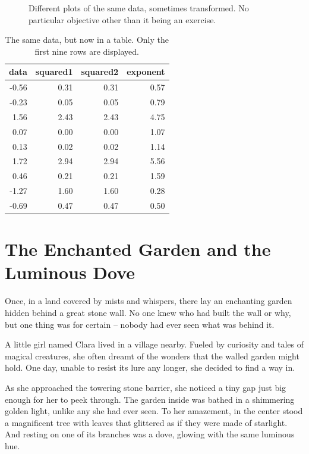 \documentclass[10pt, a4paper, titlepage]{article}
\begin{document}
\begin{figure}[htbp]
    \caption{Different plots of the same data, sometimes transformed. No particular objective other than it being an exercise.}
    \label{fig:main}
\end{figure}

\begin{table}[!h]
\centering
\caption{The same data, but now in a table. Only the first nine rows are displayed.} 
\begin{tabular}{rrrr}
  \hline
data & squared1 & squared2 & exponent \\ 
  \hline
-0.56 & 0.31 & 0.31 & 0.57 \\ 
  -0.23 & 0.05 & 0.05 & 0.79 \\ 
  1.56 & 2.43 & 2.43 & 4.75 \\ 
  0.07 & 0.00 & 0.00 & 1.07 \\ 
  0.13 & 0.02 & 0.02 & 1.14 \\ 
  1.72 & 2.94 & 2.94 & 5.56 \\ 
  0.46 & 0.21 & 0.21 & 1.59 \\ 
  -1.27 & 1.60 & 1.60 & 0.28 \\ 
  -0.69 & 0.47 & 0.47 & 0.50 \\ 
   \hline
\end{tabular}
\end{table}

\section{The Enchanted Garden and the Luminous Dove}

Once, in a land covered by mists and whispers, there lay an enchanting garden hidden behind a great stone wall. No one knew who had built the wall or why, but one thing was for certain – nobody had ever seen what was behind it.

A little girl named Clara lived in a village nearby. Fueled by curiosity and tales of magical creatures, she often dreamt of the wonders that the walled garden might hold. One day, unable to resist its lure any longer, she decided to find a way in.

As she approached the towering stone barrier, she noticed a tiny gap just big enough for her to peek through. The garden inside was bathed in a shimmering golden light, unlike any she had ever seen. To her amazement, in the center stood a magnificent tree with leaves that glittered as if they were made of starlight. And resting on one of its branches was a dove, glowing with the same luminous hue.
\end{document}
